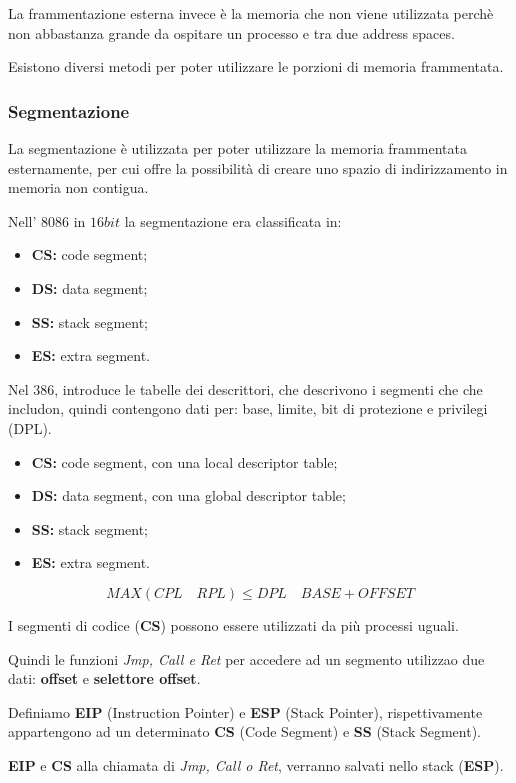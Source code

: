 La frammentazione esterna invece è la memoria che non viene utilizzata perchè
non abbastanza grande da ospitare un processo e tra due address spaces.

Esistono diversi metodi per poter utilizzare le porzioni di memoria
frammentata.

\subsubsection{Segmentazione}
La segmentazione è utilizzata per poter utilizzare la memoria frammentata
esternamente, per cui offre la possibilità di creare uno spazio di
indirizzamento in memoria non contigua.


Nell' $8086$ in $16bit$ la segmentazione era classificata in:
\begin{itemize}
  \item \textbf{CS:} code segment;
  \item \textbf{DS:} data segment;
  \item \textbf{SS:} stack segment;
  \item \textbf{ES:} extra segment.
\end{itemize}

Nel $386$, introduce le tabelle dei descrittori, che descrivono i segmenti che
che includon, quindi contengono dati per: base, limite, bit di protezione e
privilegi (DPL).

\begin{itemize}
  \item \textbf{CS:} code segment, con una local descriptor table;
  \item \textbf{DS:} data segment, con una global descriptor table;
  \item \textbf{SS:} stack segment;
  \item \textbf{ES:} extra segment.
\end{itemize}
\[
  MAX(CPL \quad RPL) \leq DPL \quad BASE + OFFSET
\]

I segmenti di codice (\textbf{CS}) possono essere utilizzati da più processi
uguali.

Quindi le funzioni \textit{Jmp, Call e Ret} per accedere ad un segmento
utilizzao due dati: \textbf{offset} e \textbf{selettore offset}.

Definiamo \textbf{EIP} (Instruction Pointer) e \textbf{ESP} (Stack Pointer),
rispettivamente appartengono ad un determinato \textbf{CS} (Code Segment) e
\textbf{SS} (Stack Segment).

\textbf{EIP} e \textbf{CS} alla chiamata di \textit{Jmp, Call o Ret}, verranno
salvati nello stack (\textbf{ESP}).



